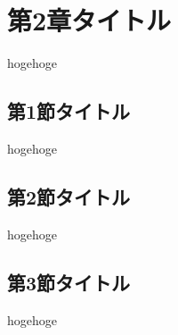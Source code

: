\chapter{第2章タイトル}
hogehoge

  \section{第1節タイトル}
  hogehoge

  \section{第2節タイトル}
  hogehoge

  \section{第3節タイトル}
  hogehoge
